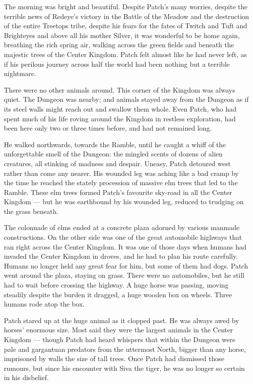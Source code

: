 \documentclass[12pt]{book}
\begin{document}
The morning was bright and beautiful. Despite Patch's many worries, despite the terrible news of Redeye's victory in the Battle of the Meadow and the destruction of the entire Treetops tribe, despite his fears for the fates of Twitch and Tuft and Brighteyes and above all his mother Silver, it was wonderful to be home again, breathing the rich spring air, walking across the green fields and beneath the majestic trees of the Center Kingdom. Patch felt almost like he had never left, as if his perilous journey across half the world had been nothing but a terrible nightmare.

There were no other animals around. This corner of the Kingdom was always quiet. The Dungeon was nearby; and animals stayed away from the Dungeon as if its steel walls might reach out and swallow them whole. Even Patch, who had spent much of his life roving around the Kingdom in restless exploration, had been here only two or three times before, and had not remained long. 

He walked northwards, towards the Ramble, until he caught a whiff of the unforgettable smell of the Dungeon: the mingled scents of dozens of alien creatures, all stinking of madness and despair. Uneasy, Patch detoured west rather than come any nearer. His wounded leg was aching like a bad cramp by the time he reached the stately procession of massive elm trees that led to the Ramble. These elm trees formed Patch's favourite sky-road in all the Center Kingdom ---
but he was earthbound by his wounded leg, reduced to trudging on the grass beneath.

The colonnade of elms ended at a concrete plaza adorned by various manmade constructions. On the other side was one of the great automobile highways that ran right across the Center Kingdom. It was one of those days when humans had invaded the Center Kingdom in droves, and he had to plan his route carefully. Humans no longer held any great fear for him, but some of them had dogs. Patch went around the plaza, staying on grass. There were no automobiles, but he still had to wait before crossing the highway. A huge horse was passing, moving steadily despite the burden it dragged, a huge wooden box on wheels. Three humans rode atop the box.

Patch stared up at the huge animal as it clopped past. He was always awed by horses' enormous size. Most said they were the largest animals in the Center Kingdom ---
though Patch had heard whispers that within the Dungeon were pale and gargantuan predators from the uttermost North, bigger than any horse, imprisoned by walls the size of tall trees. Once Patch had dismissed those rumours, but since his encounter with Siva the tiger, he was no longer so certain in his disbelief.
\end{document}
